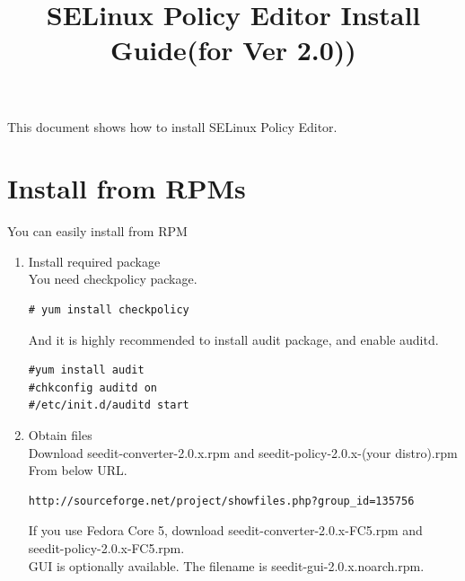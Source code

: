 \documentclass{article}
\title{SELinux Policy Editor Install Guide(for Ver 2.0))}
\begin{document}
\def\labelenumi{(\theenumi)}
\maketitle
\tableofcontents
\newpage

This document shows how to install SELinux Policy Editor.

\section{Install from RPMs}\label{sec:rpm}
You can easily install from RPM
\begin{enumerate}
 \item Install required package\\
       You need checkpolicy package.
\begin{verbatim}
# yum install checkpolicy		
\end{verbatim}
And it is highly recommended to install audit package, and enable
       auditd.
\begin{verbatim}
#yum install audit
#chkconfig auditd on
#/etc/init.d/auditd start
\end{verbatim}


    \item Obtain files\\
Download seedit-converter-2.0.x.rpm and seedit-policy-2.0.x-(your
	  distro).rpm
From below URL.
\begin{verbatim}
http://sourceforge.net/project/showfiles.php?group_id=135756	
\end{verbatim}
If you use Fedora Core 5, download seedit-converter-2.0.x-FC5.rpm and
       seedit-policy-2.0.x-FC5.rpm.\\
GUI is optionally available. The filename is seedit-gui-2.0.x.noarch.rpm.



\end{enumerate}
\end{document}
